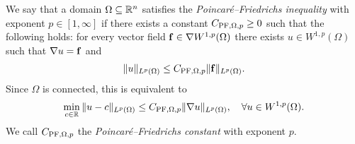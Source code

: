 \documentclass[12pt,a4paper]{article}
\begin{document}

We say that a domain $\Omega \subseteq {\mathbb R}^{n}$ satisfies the \emph{Poincar\'e--Friedrichs inequality} with exponent $p \in [1,\infty]$
if there exists a constant $C_{{\rm PF},\Omega,p} \geq 0$ such that the following holds:
for every vector field ${\mathbf f} \in \nabla W^{1,p}(\Omega)$ there exists $u \in W^{1,p}(\Omega)$
such that $\nabla u = {\mathbf f}$ and 
\begin{align}\label{math:inequalitypf:gradient}
    \| u \|_{L^{p}(\Omega)}
    \leq 
    C_{{\rm PF},\Omega,p} 
    \| {\mathbf f} \|_{L^{p}(\Omega)}
    .
\end{align}
Since $\Omega$ is connected, this is equivalent to  
\begin{align}
    \min_{ c \in {\mathbb R} } \| u - c \|_{L^{p}(\Omega)}
    \leq 
    C_{{\rm PF},\Omega,p} 
    \| \nabla u \|_{L^{p}(\Omega)},
    \quad 
    \forall 
    u \in W^{1,p}(\Omega)
    .
\end{align}
We call $C_{{\rm PF},\Omega,p}$ the \emph{Poincar\'e--Friedrichs constant} with exponent $p$. 
\\
\end{document}

